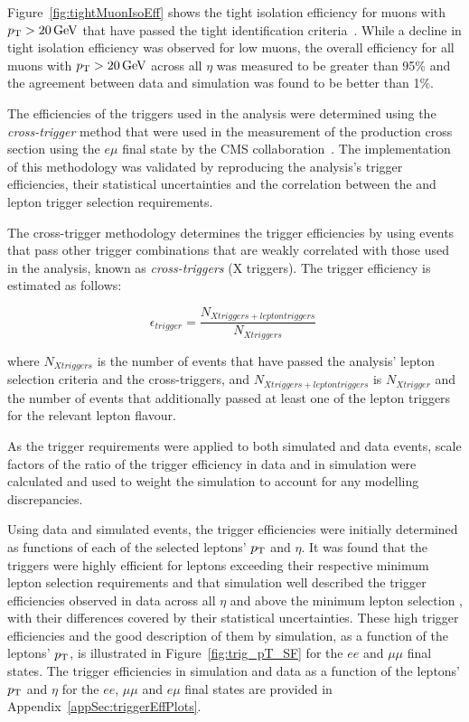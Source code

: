 Figure~\ref{fig:tightMuonIsoEff} shows the tight isolation efficiency for muons with $p_{\mathrm{T}} > 20\,\text{Ge\hspace{-.08em}V}$ that have passed the tight identification criteria~\cite{CMS-DP-2017-007}.
While a decline in tight isolation efficiency was observed for low \pT muons, the overall efficiency for all muons with $p_{\mathrm{T}} > 20\,\text{Ge\hspace{-.08em}V}$ across all $\eta$ was measured to be greater than 95\% and the agreement between data and simulation was found to be better than 1\%.

The efficiencies of the triggers used in the analysis were determined using the \emph{cross-trigger} method that were used in the measurement of the \ttbar production cross section using the $e\mu$ final state by the CMS collaboration~\cite{Khachatryan:2016kzg}.
The implementation of this methodology was validated by reproducing the \ttbar analysis's trigger efficiencies, their statistical uncertainties and the correlation between the \MET and lepton trigger selection requirements. 

The cross-trigger methodology determines the trigger efficiencies by using events that pass other trigger combinations that are weakly correlated with those used in the analysis, known as \emph{cross-triggers} (X triggers).
The trigger efficiency is estimated as follows:

\begin{equation}
\epsilon_{trigger} = \frac{N_{X triggers + lepton triggers}}{N_{X triggers}} \;
\end{equation}

where $N_{X triggers}$ is the number of events that have passed the analysis' lepton selection criteria and the cross-triggers, and $N_{X triggers + lepton triggers}$ is $N_{X trigger}$ and the number of events that additionally passed at least one of the lepton triggers for the relevant lepton flavour.

As the trigger requirements were applied to both simulated and data events, scale factors of the ratio of the trigger efficiency in data and in simulation were calculated and used to weight the simulation to account for any modelling discrepancies.

Using data and simulated \ttbar events, the trigger efficiencies were initially determined as functions of each of the selected leptons' $p_{\mathrm{T}}$ and $\eta$.
It was found that the triggers were highly efficient for leptons exceeding their respective minimum lepton \pT selection requirements and that simulation well described the trigger efficiencies observed in data across all $\eta$ and above the minimum lepton selection \pT, with their differences covered by their statistical uncertainties.
These high trigger efficiencies and the good description of them by simulation, as a function of the leptons' $p_{\mathrm{T}}$, is illustrated in Figure~\ref{fig:trig_pT_SF} for the $ee$ and $\mu\mu$ final states.
The trigger efficiencies in simulation and data as a function of the leptons' $p_{\mathrm{T}}$ and $\eta$ for the $ee$, $\mu\mu$ and $e\mu$ final states are provided in Appendix~\ref{appSec:triggerEffPlots}.

